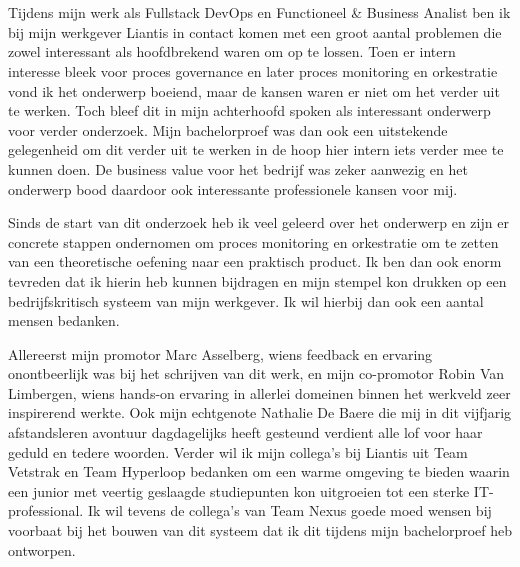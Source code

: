 
\chapter*{}%
\label{ch:voorwoord}

Tijdens mijn werk als Fullstack DevOps en Functioneel & Business Analist ben ik bij mijn werkgever Liantis in contact komen met een groot aantal problemen die zowel interessant als hoofdbrekend waren om op te lossen. Toen er intern interesse bleek voor proces governance en later proces monitoring en orkestratie vond ik het onderwerp boeiend, maar de kansen waren er niet om het verder uit te werken. Toch bleef dit in mijn achterhoofd spoken als interessant onderwerp voor verder onderzoek. Mijn bachelorproef was dan ook een uitstekende gelegenheid om dit verder uit te werken in de hoop hier intern iets verder mee te kunnen doen. De business value voor het bedrijf was zeker aanwezig en het onderwerp bood daardoor ook interessante professionele kansen voor mij.\newline

Sinds de start van dit onderzoek heb ik veel geleerd over het onderwerp en zijn er concrete stappen ondernomen om proces monitoring en orkestratie om te zetten van een theoretische oefening naar een praktisch product. Ik ben dan ook enorm tevreden dat ik hierin heb kunnen bijdragen en mijn stempel kon drukken op een bedrijfskritisch systeem van mijn werkgever. Ik wil hierbij dan ook een aantal mensen bedanken. \newline

Allereerst mijn promotor Marc Asselberg, wiens feedback en ervaring onontbeerlijk was bij het schrijven van dit werk, en mijn co-promotor Robin Van Limbergen, wiens hands-on ervaring in allerlei domeinen binnen het werkveld zeer inspirerend werkte. Ook mijn echtgenote Nathalie De Baere die mij in dit vijfjarig afstandsleren avontuur dagdagelijks heeft gesteund verdient alle lof voor haar geduld en tedere woorden. Verder wil ik mijn collega's bij Liantis uit Team Vetstrak en Team Hyperloop bedanken om een warme omgeving te bieden waarin een junior met veertig geslaagde studiepunten kon uitgroeien tot een sterke IT-professional. Ik wil tevens de collega's van Team Nexus goede moed wensen bij voorbaat bij het bouwen van dit systeem dat ik dit tijdens mijn bachelorproef heb ontworpen.    